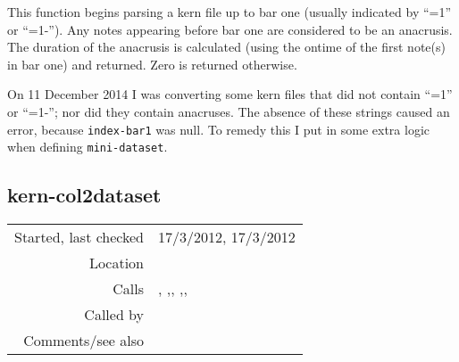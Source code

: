 \noindent This function begins parsing a kern file up
to bar one (usually indicated by ``=1'' or ``=1-'').
Any notes appearing before bar one are considered to be
an anacrusis. The duration of the anacrusis is
calculated (using the ontime of the first note(s) in
bar one) and returned. Zero is returned otherwise.

On 11 December 2014 I was converting some kern files
that did not contain ``=1'' or ``=1-''; nor did they
contain anacruses. The absence of these strings
caused an error, because \texttt{index-bar1} was null.
To remedy this I put in some extra logic when defining
\texttt{mini-dataset}.


\subsection*{kern-col2dataset}\label{fun:kern-col2dataset}

\vspace{0.3cm}
\begin{tabular}{r|p{8cm}}
Started, last checked & 17/3/2012, 17/3/2012 \\
Location & \nameref{sec:kern-by-col} \\
Calls & \nameref{fun:append-list}, \nameref{fun:constant-vector},\newline \nameref{fun:parse-kern-spaced-notes}, \nameref{fun:resolve-ties-kern},\newline \nameref{fun:return-lists-of-length-n}, \nameref{fun:sort-dataset-asc} \\
Called by & \nameref{fun:kern-file2dataset-by-col} \\
Comments/see also &
\end{tabular}


